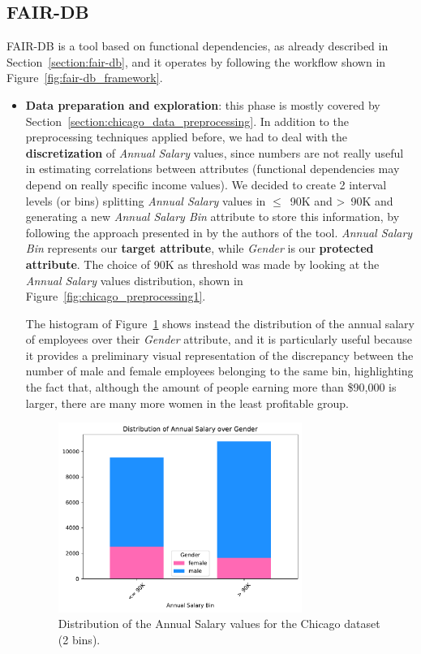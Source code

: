 \subsection{FAIR-DB}
\label{section:chicago_fair-db}
FAIR-DB is a tool based on functional dependencies, as already described in Section~\ref{section:fair-db}, and it operates by following the workflow shown in Figure~\ref{fig:fair-db_framework}.
\begin{itemize}
\item \textbf{Data preparation and exploration}: this phase is mostly covered by Section~\ref{section:chicago_data_preprocessing}. In addition to the preprocessing techniques applied before, we had to deal with the \textbf{discretization} of \textit{Annual Salary} values, since numbers are not really useful in estimating correlations between attributes (functional dependencies may depend on really specific income values). We decided to create 2 interval levels (or bins) splitting \textit{Annual Salary} values in \(\leq\)~90K and >~90K and generating a new \textit{Annual Salary Bin} attribute to store this information, by following the approach presented in \cite{azzalini2021fair} by the authors of the tool. \textit{Annual Salary Bin} represents our \textbf{target attribute}, while \textit{Gender} is our \textbf{protected attribute}. The choice of 90K as threshold was made by looking at the \textit{Annual Salary} values distribution, shown in Figure~\ref{fig:chicago_preprocessing1}.

The histogram of Figure~\ref{fig:chicago_fair-db1} shows instead the distribution of the annual salary of employees over their \textit{Gender} attribute, and it is particularly useful because it provides a preliminary visual representation of the discrepancy between the number of male and female employees belonging to the same bin, highlighting the fact that, although the amount of people earning more than \$90,000 is larger, there are many more women in the least profitable group.

\begin{figure}[t!]
\centering
\includegraphics[width=0.75\textwidth]{figures/chicago_2bins_annual_salary_over_gender.pdf}
\caption{Distribution of the \textrm{Annual Salary} values for the Chicago dataset (2 bins).}
\label{fig:chicago_fair-db1}
\end{figure}


\end{itemize}
